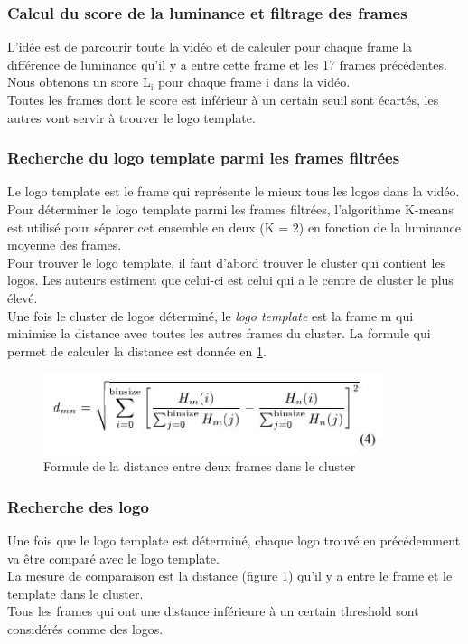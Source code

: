 \documentclass[11pt]{article}
\begin{document}
\subsubsection{Calcul du score de la luminance et filtrage des frames}
\label{sec:org31c1ddb}
L'idée est de parcourir toute la vidéo et de calculer pour chaque frame la différence de luminance qu'il y a entre cette frame et les 17 frames précédentes.\\
Nous obtenons un score L\(_{\text{i}}\) pour chaque frame i dans la vidéo.\\
Toutes les frames dont le score est inférieur à un certain seuil sont écartés, les autres vont servir à trouver le logo template.\\

\subsubsection{Recherche du logo template parmi les frames filtrées}
\label{sec:org6f920e0}
Le logo template est le frame qui représente le mieux tous les logos dans la vidéo.\\
Pour déterminer le logo template parmi les frames filtrées, l'algorithme K-means est utilisé pour séparer cet ensemble en deux (K = 2) en fonction de la luminance moyenne des frames.\\
Pour trouver le logo template, il faut d'abord trouver le cluster qui contient les logos. Les auteurs estiment que celui-ci est celui qui a le centre de cluster le plus élevé.\\
Une fois le cluster de logos déterminé, le \emph{logo template} est la frame m qui minimise la distance avec toutes les autres frames du cluster. La formule qui permet de calculer la distance est donnée en \ref{calc-dist}.\\

\begin{figure}[htbp]
\centering
\includegraphics[width=10cm]{robust_calc_dist.JPG}
\caption{Formule de la distance entre deux frames dans le cluster \label{calc-dist}}
\end{figure}

\subsubsection{Recherche des logo}
\label{sec:org0261251}
Une fois que le logo template est déterminé, chaque logo trouvé en précédemment va être comparé avec le logo template.\\
La mesure de comparaison est la distance (figure \ref{calc-dist}) qu'il y a entre le frame et le template dans le cluster.\\
Tous les frames qui ont une distance inférieure à un certain threshold sont considérés comme des logos.\\
\end{document}
